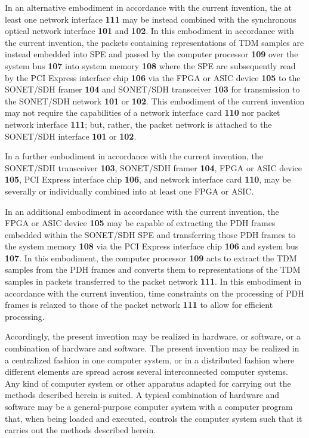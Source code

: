 \documentclass[letterpaper,final,notitlepage,twocolumn,10pt,twoside]{article}
\begin{document}
In an alternative embodiment in accordance with the current invention, the at
least one network interface \textbf{111} may be instead combined with the
synchronous optical network interface \textbf{101} and \textbf{102}.  In this
embodiment in accordance with the current invention, the packets containing
representations of TDM samples are instead embedded into SPE and passed by the
computer processor \textbf{109} over the system bus \textbf{107} into system
memory \textbf{108} where the SPE are subsequently read by the PCI Express
interface chip \textbf{106} via the FPGA or ASIC device \textbf{105} to the
SONET/SDH framer \textbf{104} and SONET/SDH transceiver \textbf{103} for
transmission to the SONET/SDH network \textbf{101} or \textbf{102}.  This
embodiment of the current invention may not require the capabilities of a
network interface card \textbf{110} nor packet network interface \textbf{111};
but, rather, the packet network is attached to the SONET/SDH interface
\textbf{101} or \textbf{102}.

In a further embodiment in accordance with the current invention, the
SONET/SDH transceiver \textbf{103}, SONET/SDH framer \textbf{104}, FPGA or
ASIC device \textbf{105}, PCI Express interface chip \textbf{106}, and network
interface card \textbf{110}, may be severally or individually combined into at
least one FPGA or ASIC.

In an additional embodiment in accordance with the current invention, the FPGA
or ASIC device \textbf{105} may be capable of extracting the PDH frames
embedded within the SONET/SDH SPE and transferring those PDH frames to the
system memory \textbf{108} via the PCI Express interface chip \textbf{106}
and system bus \textbf{107}.  In this embodiment, the computer processor
\textbf{109} acts to extract the TDM samples from the PDH frames and converts
them to representations of the TDM samples in packets transferred to the
packet network \textbf{111}.  In this embodiment in accordance with the
current invention, time constraints on the processing of PDH frames is relaxed
to those of the packet network \textbf{111} to allow for efficient processing.



Accordingly, the present invention may be realized in hardware, or software,
or a combination of hardware and software.  The present invention may be
realized in a centralized fashion in one computer system, or in a distributed
fashion where different elements are spread across several interconnected
computer systems.  Any kind of computer system or other apparatus adapted for
carrying out the methods described herein is suited.  A typical combination of
hardware and software may be a general-purpose computer system with a computer
program that, when being loaded and executed, controls the computer system
such that it carries out the methods described herein.
\end{document}

